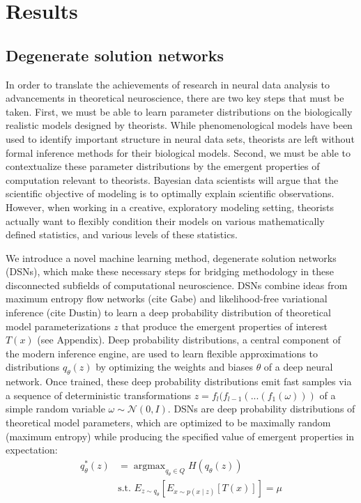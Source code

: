 \documentclass[11pt]{article}
\DeclareMathOperator*{\argmax}{argmax}
\begin{document}
\section{Results}
\subsection{Degenerate solution networks}
In order to translate the achievements of research in neural data analysis to advancements in theoretical neuroscience, there are two key steps that must be taken. First, we must be able to learn parameter distributions on the biologically realistic models designed by theorists.  While phenomenological models have been used to identify important structure in neural data sets, theorists are left without formal inference methods for their biological models.  Second, we must be able to contextualize these parameter distributions by the emergent properties of computation relevant to theorists.  Bayesian data scientists will argue that the scientific objective of modeling is to optimally explain scientific observations.  However, when working in a creative, exploratory modeling setting, theorists actually want to flexibly condition their models on various mathematically defined statistics, and various levels of these statistics.

We introduce a novel machine learning method, degenerate solution networks (DSNs), which make these necessary steps for bridging methodology in these disconnected subfields of computational neuroscience.  DSNs combine ideas from maximum entropy flow networks (cite Gabe) and likelihood-free variational inference (cite Dustin) to learn a deep probability distribution of theoretical model parameterizations $z$ that produce the emergent properties of interest $T(x)$ (see Appendix).  Deep probability distributions, a central component of the modern inference engine, are used to learn flexible approximations to distributions $q_\theta(z)$ by optimizing the weights and biases $\theta$ of a deep neural network.  Once trained, these deep probability distributions emit fast samples via a sequence of deterministic transformations $z = f_l(f_{l-1}( ... (f_1(\omega)))$ of a simple random variable $\omega \sim \mathcal{N}(0, I)$. DSNs are deep probability distributions of theoretical model parameters, which are optimized to be maximally random (maximum entropy) while producing the specified value of emergent properties in expectation:
\begin{equation}
\begin{split}
q_\theta^*(z) &= \argmax_{q_\theta \in Q} H(q_\theta(z)) \\
 &  \text{s.t.  } E_{z \sim q_\theta}\left[ E_{x\sim p(x \mid z)}\left[T(x)\right] \right] = \mu \\
 \end{split}
\end{equation}
\end{document}
